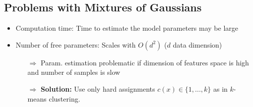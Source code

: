 \subsection{Problems with Mixtures of Gaussians}
\begin{itemize}
	\item Computation time: Time to estimate the model parameters may be large
	\item Number of free parameters: Scales with $O(d^2)$ ($d$ data dimension)
	\begin{itemize}
		\item[$\Rightarrow$] Param. estimation problematic if dimension of features space is high and number of samples is slow
		\item[$\Rightarrow$] \textbf{Solution: } Use only hard assignments $c(x) \in \{1, ..., k\}$ as in $k$-means clustering.
	\end{itemize}	
\end{itemize}

